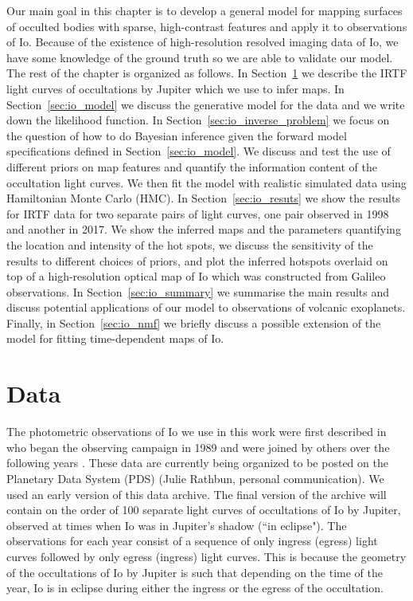 \documentclass[12pt,dvipsnames]{report}
\begin{document}
Our main goal in this chapter is to develop a general model for mapping surfaces of 
occulted bodies with sparse, high-contrast features and apply it to observations of Io.
Because of the existence of high-resolution resolved imaging data of Io, we have some 
knowledge of the ground truth so we are able to validate our model.
The rest of the chapter is organized as follows.
In Section~\ref{sec:io_data} we describe the IRTF light curves of occultations by Jupiter 
which we use to infer maps.
In Section~\ref{sec:io_model} we discuss the generative model for the data and we write down 
the likelihood function.
In Section~\ref{sec:io_inverse_problem} we focus on the question of how to do Bayesian inference 
given the forward model specifications defined in Section~\ref{sec:io_model}.
We discuss and test the use of different priors on map features and quantify the 
information content of the occultation light curves. 
We then fit the model with realistic simulated data using Hamiltonian Monte Carlo (HMC).
In Section~\ref{sec:io_resuts} we show the results for IRTF data for two separate pairs of 
light curves, one pair observed in 1998 and another in 2017.
We show the inferred maps and the parameters quantifying the location and intensity of 
the hot spots, we discuss the sensitivity of the results to different choices of priors,
and plot the inferred hotspots overlaid on top of a high-resolution optical map of 
Io which was constructed from Galileo observations.
In Section~\ref{sec:io_summary} we summarise the main results and 
discuss potential applications of our model to observations of volcanic exoplanets.
Finally, in Section~\ref{sec:io_nmf} we briefly discuss a possible extension of the 
model for fitting time-dependent maps of Io.

\section{Data}
\label{sec:io_data}
The photometric observations of Io we use in this work were first described in 
\citet{1994Icar..107..195S} who began the observing campaign in 1989 and were joined 
by others over the following years 
\citep{1997GeoRL..24.2455S,2002GeoRL..29.1443R,2006GeoRL..3317201R,2010Icar..209..625R}. 
These data are currently being organized to be posted on the Planetary Data System (PDS) (Julie Rathbun, personal communication).  
We used an early version of this data archive.
The final version of the archive will contain on the order of 100 separate light 
curves of occultations of Io by Jupiter, observed at times when Io was in Jupiter's 
shadow (``in eclipse"). 
The observations for each year consist of a sequence of only ingress (egress) light 
curves followed by only egress (ingress) light curves. 
This is because the geometry of the occultations of Io by Jupiter is such that 
depending on the time of the year, Io is in eclipse during either the ingress or the 
egress of the occultation.
\end{document}
